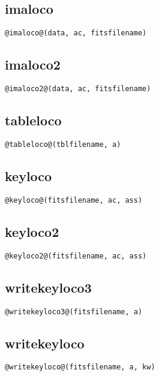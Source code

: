 \subsection{imaloco}
\begin{lstlisting}[style=pythonstyle]
@imaloco@(data, ac, fitsfilename)
\end{lstlisting}

\subsection{imaloco2}
\begin{lstlisting}[style=pythonstyle]
@imaloco2@(data, ac, fitsfilename)
\end{lstlisting}

\subsection{tableloco}
\begin{lstlisting}[style=pythonstyle]
@tableloco@(tblfilename, a)
\end{lstlisting}

\subsection{keyloco}
\begin{lstlisting}[style=pythonstyle]
@keyloco@(fitsfilename, ac, ass)
\end{lstlisting}

\subsection{keyloco2}
\begin{lstlisting}[style=pythonstyle]
@keyloco2@(fitsfilename, ac, ass)
\end{lstlisting}

\subsection{writekeyloco3}
\begin{lstlisting}[style=pythonstyle]
@writekeyloco3@(fitsfilename, a)
\end{lstlisting}

\subsection{writekeyloco}
\begin{lstlisting}[style=pythonstyle]
@writekeyloco@(fitsfilename, a, kw)
\end{lstlisting}

